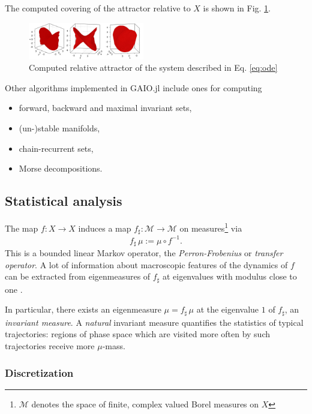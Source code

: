 \documentclass{juliacon}
\newcommand{\cM}{\mathcal{M}}
\begin{document}
The computed covering of the attractor relative to $X$ is shown in Fig. \ref{fig:attractor}.  

\begin{figure}[h]
    \centering
    \includegraphics[width=0.45\textwidth]{attractor.jpg}
    \caption{Computed relative attractor of the system described in Eq. \ref{eq:ode}}
    \label{fig:attractor}
\end{figure}


Other algorithms implemented in GAIO.jl include ones for computing
\begin{itemize}[label=$\bullet$]
    \item forward, backward and maximal invariant sets,
    \item (un-)stable manifolds,
    \item chain-recurrent sets,
    \item Morse decompositions.
\end{itemize}

\subsection{Statistical analysis}
\label{sec:architecture}

The map $f:X \to X$ induces a map $f_\sharp : \cM \to \cM$ on measures\footnote{$\cM$ denotes the space of finite, complex valued Borel measures on $X$} via 
\begin{equation}
    f_\sharp\, \mu := \mu \circ f^{-1}.
\end{equation}
This is a bounded linear Markov operator, the \emph{Perron-Frobenius} or \emph{transfer operator}.  A lot of information about macroscopic features of the dynamics of $f$ can be extracted from eigenmeasures of $f_\sharp$ at eigenvalues with modulus close to one \cite{DeJu:99}.   

In particular, there exists \cite{invariantmeasureexistence} an eigenmeasure $\mu = f_\sharp\, \mu$ at the eigenvalue $1$ of $f_\sharp$, an \emph{invariant measure}. A \emph{natural} invariant measure \cite{} quantifies the statistics of typical trajectories: regions of phase space which are visited more often by such trajectories receive more $\mu$-mass.  

\subsubsection*{Discretization} 
\end{document}
